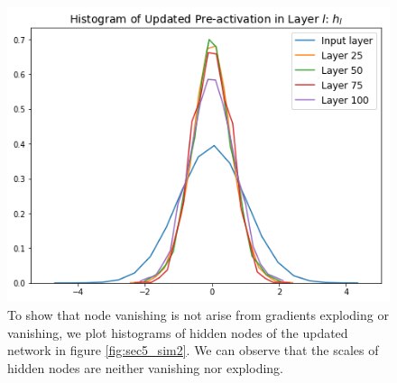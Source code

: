 \begin{figure}
    \begin{minipage}[c]{0.67\textwidth}
        \includegraphics[width=\textwidth]{NodeHistogram}
    \end{minipage}\hfill
    \begin{minipage}[c]{0.3\textwidth}
        \caption{To show that node vanishing is not arise from gradients exploding or vanishing, we plot histograms of hidden nodes of the updated network in figure \ref{fig:sec5_sim2}. We can observe that the scales of hidden nodes are neither vanishing nor exploding.}
        \label{fig:sec6_sim1}
    \end{minipage}
\end{figure}